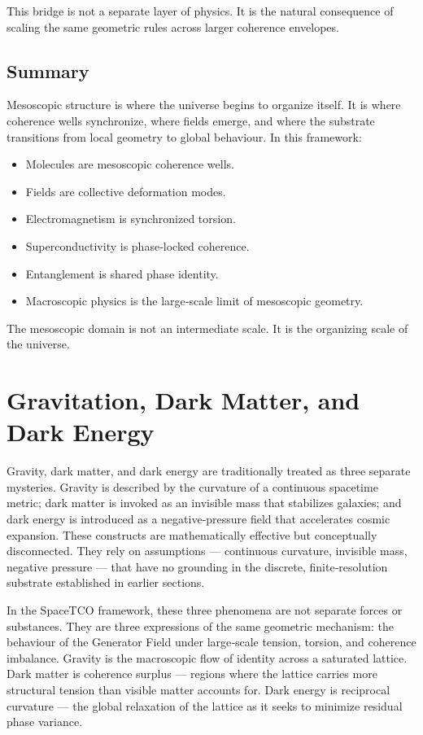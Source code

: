 \documentclass[reprint,amsmath,amssymb,aps,prl,floatfix]{revtex4-2}
\begin{document}
\begin{itemize}
This bridge is not a separate layer of physics.  
It is the natural consequence of scaling the same geometric rules across larger coherence envelopes.

\subsection{Summary}

Mesoscopic structure is where the universe begins to organize itself. It is where coherence wells synchronize, where fields emerge, and where the substrate transitions from local geometry to global behaviour. In this framework:
\begin{itemize}
\item Molecules are mesoscopic coherence wells.  
\item Fields are collective deformation modes.  
\item Electromagnetism is synchronized torsion.  
\item Superconductivity is phase‑locked coherence.  
\item Entanglement is shared phase identity.  
\item Macroscopic physics is the large‑scale limit of mesoscopic geometry.
\end{itemize}
\medskip

The mesoscopic domain is not an intermediate scale.  
It is the organizing scale of the universe.

\section{Gravitation, Dark Matter, and Dark Energy}

Gravity, dark matter, and dark energy are traditionally treated as three separate mysteries. Gravity is described by the curvature of a continuous spacetime metric; dark matter is invoked as an invisible mass that stabilizes galaxies; and dark energy is introduced as a negative‑pressure field that accelerates cosmic expansion. These constructs are mathematically effective but conceptually disconnected. They rely on assumptions — continuous curvature, invisible mass, negative pressure — that have no grounding in the discrete, finite‑resolution substrate established in earlier sections.
\medskip

In the SpaceTCO framework, these three phenomena are not separate forces or substances. They are three expressions of the same geometric mechanism: the behaviour of the Generator Field under large‑scale tension, torsion, and coherence imbalance. Gravity is the macroscopic flow of identity across a saturated lattice. Dark matter is coherence surplus — regions where the lattice carries more structural tension than visible matter accounts for. Dark energy is reciprocal curvature — the global relaxation of the lattice as it seeks to minimize residual phase variance.
\medskip


\end{itemize}
\end{document}
